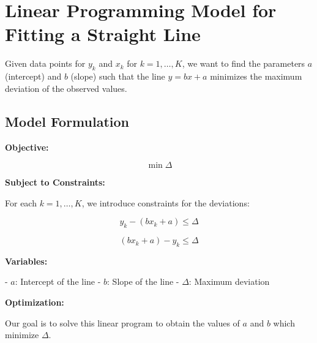 \documentclass{article}
\begin{document}
\section*{Linear Programming Model for Fitting a Straight Line}

Given data points for \( y_k \) and \( x_k \) for \( k = 1, \ldots, K \), we want to find the parameters \( a \) (intercept) and \( b \) (slope) such that the line \( y = bx + a \) minimizes the maximum deviation of the observed values.

\subsection*{Model Formulation}

\textbf{Objective:}

\[
\min \Delta 
\]

\textbf{Subject to Constraints:}

For each \( k = 1, \ldots, K \), we introduce constraints for the deviations:

\[
y_k - (b x_k + a) \leq \Delta
\]

\[
(b x_k + a) - y_k \leq \Delta
\]

\textbf{Variables:}

- \( a \): Intercept of the line
- \( b \): Slope of the line
- \( \Delta \): Maximum deviation

\textbf{Optimization:}

Our goal is to solve this linear program to obtain the values of \( a \) and \( b \) which minimize \( \Delta \).
\end{document}
